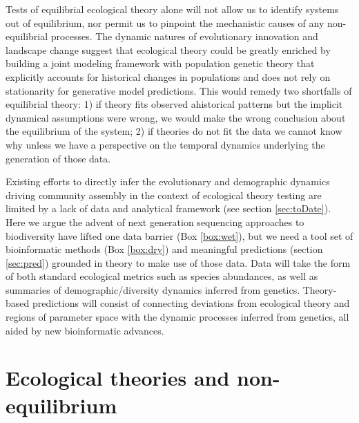 \documentclass[12pt]{article}
\newcounter{Box}
\begin{document}
Tests of equilibrial ecological theory alone will not allow us to
identify systems out of equilibrium, nor permit us to pinpoint the
mechanistic causes of any non-equilibrial
processes. The dynamic natures of evolutionary innovation and
landscape change suggest that ecological theory could be greatly
enriched by building a joint modeling framework with population
% 
% 
genetic theory that explicitly accounts for historical changes in
populations and does not rely on stationarity for generative model
predictions. This would remedy two shortfalls of equilibrial theory:
1) if theory fits observed ahistorical patterns but the implicit
dynamical assumptions were wrong, we would make the wrong conclusion
about the equilibrium of the system; 2) if theories do
not fit the data we cannot know why unless we have a perspective on
the temporal dynamics underlying the generation of those data.

Existing efforts to directly infer the evolutionary and demographic
dynamics driving community assembly in the context of ecological
theory testing are limited by a lack of data and analytical framework
(see section \ref{sec:toDate}).  Here we argue the advent of next
generation sequencing approaches to biodiversity \citep{Yu2012,
  ji2013, tang2014, dodsworth2015} have lifted one data barrier (Box
\ref{box:wet}), but we need a tool set of bioinformatic methods (Box
\ref{box:dry}) and meaningful predictions (section \ref{sec:pred})
grounded in theory to make use of those data. Data will take the form
of both standard ecological metrics such as species abundances, as
well as summaries of demographic/diversity dynamics inferred from
genetics. Theory-based predictions will consist of connecting
deviations from ecological theory and regions of parameter space with
the dynamic processes inferred from genetics, all aided by new
bioinformatic advances.
% 
% 


\section{Ecological theories and non-equilibrium}
\end{document}
